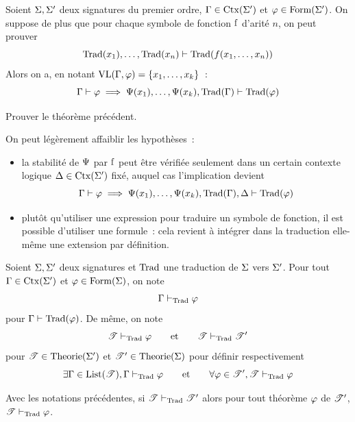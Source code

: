 \begin{theorem}
  Soient $\Sigma,\Sigma'$ deux signatures du premier ordre,
  $\Gamma \in \operatorname{Ctx}(\Sigma')$ et $\varphi \in \operatorname{Form}(\Sigma')$.
  On suppose de plus que pour chaque symbole de fonction $\mathrm{f}$ d'arité $n$,
  on peut prouver
  \[\operatorname{Trad}(x_1),\ldots,\operatorname{Trad}(x_n) \vdash \operatorname{Trad}(f(x_1,\ldots,x_n))\]
  Alors on a, en notant $\operatorname{VL}(\Gamma,\varphi) = \{x_1,\ldots,x_k\}$~:
  \[\Gamma\vdash \varphi \implies
  \Psi(x_1),\ldots,\Psi(x_k),\operatorname{Trad}(\Gamma)\vdash \operatorname{Trad}(\varphi)\]
\end{theorem}

\begin{exercise}
  Prouver le théorème précédent.
\end{exercise}

\begin{remark}
  On peut légèrement affaiblir les hypothèses~:
  \begin{itemize}
  \item la stabilité de $\Psi$ par $\mathrm{f}$ peut être vérifiée seulement dans
    un certain contexte logique $\Delta\in\operatorname{Ctx}(\Sigma')$ fixé, auquel cas
    l'implication devient
    \[\Gamma\vdash \varphi \implies \Psi(x_1),\ldots,\Psi(x_k),
    \operatorname{Trad}(\Gamma),\Delta \vdash \operatorname{Trad}(\varphi)\]
  \item plutôt qu'utiliser une expression pour traduire un symbole de fonction,
    il est possible d'utiliser une formule~: cela revient à intégrer dans la
    traduction elle-même une extension par définition.
  \end{itemize}
\end{remark}

\begin{notation}
  Soient $\Sigma,\Sigma'$ deux signatures et $\operatorname{Trad}$ une traduction de $\Sigma$
  vers $\Sigma'$. Pour tout $\Gamma \in \operatorname{Ctx}(\Sigma')$ et
  $\varphi \in \operatorname{Form}(\Sigma)$, on note
  \[\Gamma \vdash_{\operatorname{Trad}} \varphi\]
  pour $\Gamma\vdash \operatorname{Trad}(\varphi)$. De même, on note
  \[\mathscr T \vdash_{\operatorname{Trad}} \varphi\qquad \text{et}\qquad
  \mathscr T \vdash_{\operatorname{Trad}} \mathscr T'\]
  pour $\mathscr T \in \operatorname{Theorie}(\Sigma')$ et $\mathscr T' \in \operatorname{Theorie}(\Sigma)$
  pour définir respectivement
  \[\exists \Gamma\in\operatorname{List}(\mathscr T), \Gamma\vdash_{\operatorname{Trad}} \varphi
  \qquad\text{et}\qquad
  \forall \varphi \in \mathscr T', \mathscr T \vdash_{\operatorname{Trad}} \varphi\]
\end{notation}

\begin{corollary}
  Avec les notations précédentes, si $\mathscr T\vdash_{\operatorname{Trad}} \mathscr T'$ alors
  pour tout théorème $\varphi$ de $\mathscr T'$, $\mathscr T\vdash_{\operatorname{Trad}} \varphi$.
\end{corollary}

